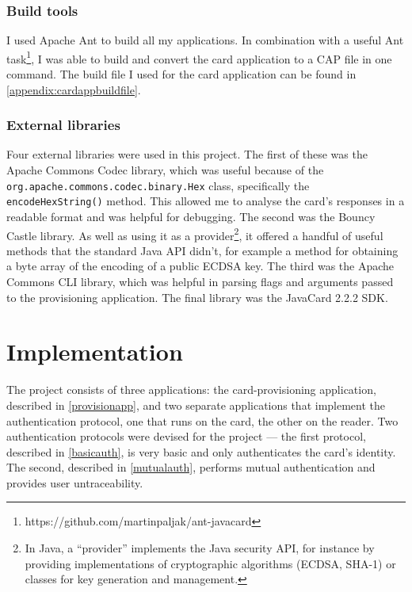 \documentclass[12pt,a4paper,twoside,openright]{report}
\begin{document}
\subsection{Build tools}

I used Apache Ant \cite{ant} to build all my applications. In combination with a useful Ant task\footnote{https://github.com/martinpaljak/ant-javacard}, I was able to build and convert the card application to a CAP file in one command. The build file I used for the card application can be found in \autoref{appendix:cardappbuildfile}.

\subsection{External libraries}

Four external libraries were used in this project. The first of these was the Apache Commons Codec \cite{apachecommonscodec} library, which was useful because of the \texttt{org.apache.commons.codec.binary.Hex} class, specifically the \texttt{encodeHexString()} method. This allowed me to analyse the card's responses in a readable format and was helpful for debugging. The second was the Bouncy Castle \cite{bouncycastle} library. As well as using it as a provider\footnote{In Java, a ``provider'' implements the Java security API, for instance by providing implementations of cryptographic algorithms (ECDSA, SHA-1) or classes for key generation and management.}, it offered a handful of useful methods that the standard Java API didn't, for example a method for obtaining a byte array of the encoding of a public ECDSA key. The third was the Apache Commons CLI \cite{apachecommonscli} library, which was helpful in parsing flags and arguments passed to the provisioning application. The final library was the JavaCard 2.2.2 SDK.

\chapter{Implementation}

The project consists of three applications: the card-provisioning application, described in \autoref{provisionapp}, and two separate applications that implement the authentication protocol, one that runs on the card, the other on the reader. Two authentication protocols were devised for the project --- the first protocol, described in \autoref{basicauth}, is very basic and only authenticates the card's identity. The second, described in \autoref{mutualauth}, performs mutual authentication and provides user untraceability.
\end{document}
